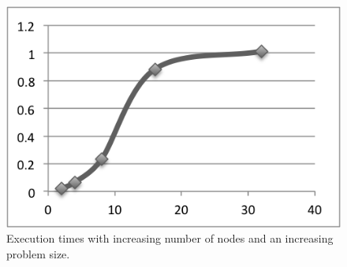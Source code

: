 \documentclass[a4paper]{article}
\begin{document}
\begin{figure}
  \centering
  \includegraphics{samescale.png}
  \caption{Execution times with increasing number of nodes and an increasing problem size.}
  \label{fig:fig3}
\end{figure}
\end{document}
